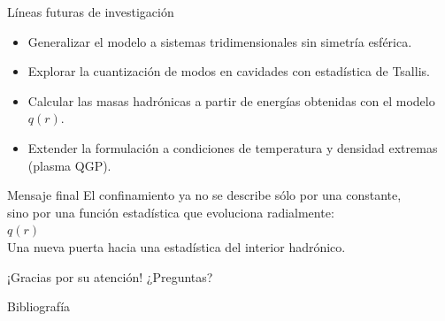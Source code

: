 \documentclass{beamer}
\begin{document}
\begin{frame}{Líneas futuras de investigación}
  \begin{itemize}
    \item Generalizar el modelo a sistemas tridimensionales sin simetría esférica.
    \item Explorar la cuantización de modos en cavidades con estadística de Tsallis.
    \item Calcular las masas hadrónicas a partir de energías obtenidas con el modelo \( q(r) \).
    \item Extender la formulación a condiciones de temperatura y densidad extremas (plasma QGP).
  \end{itemize}
\end{frame}

\begin{frame}{Mensaje final}
  \centering
  \Large
  El confinamiento ya no se describe sólo por una constante, \\[0.3cm]
  sino por una función estadística que evoluciona radialmente: \\[0.5cm]
  \textbf{\huge\( \boxed{q(r)} \)} \\[0.5cm]
  \normalsize
  Una nueva puerta hacia una estadística del interior hadrónico.
\end{frame}

\begin{frame}[standout]
  \centering
  \Large ¡Gracias por su atención!
  \centering
  \Huge ¿Preguntas?
\end{frame}

\appendix
\begin{frame}[allowframebreaks]{Bibliografía}
  \printbibliography
\end{frame}
\end{document}
